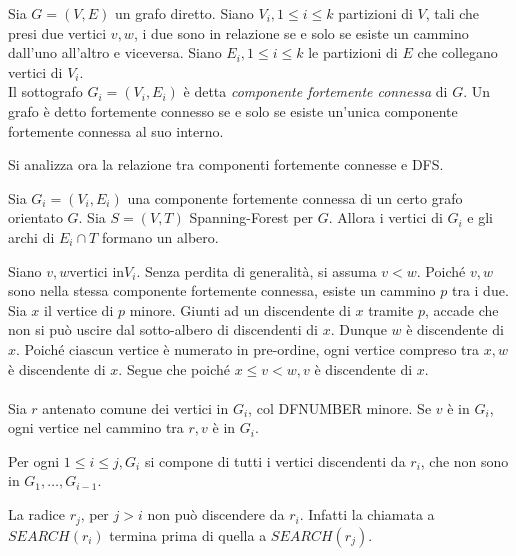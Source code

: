 \documentclass{subfiles}
\begin{document}
\begin{Definition*}
    Sia \(G = (V, E)\) un grafo diretto.
    Siano \(V_{i}, 1 \le i \le k\) partizioni di \(V\), tali che presi due vertici \(v, w\),
    i due sono in relazione se e solo se esiste un cammino dall'uno all'altro e viceversa.
    Siano \(E_{i}, 1 \le i \le k\) le partizioni di \(E\) che collegano vertici di \(V_{i}\).
    \\
    Il sottografo \(G_{i} = (V_{i}, E_{i})\) è detta \emph{componente fortemente connessa} di \(G\).
    Un grafo è detto fortemente connesso se e solo se esiste un'unica componente fortemente connessa al suo interno.
\end{Definition*}

\noindent Si analizza ora la relazione tra componenti fortemente connesse e DFS.

\begin{Lemma}
    Sia \(G_{i} = (V_{i}, E_{i})\) una componente fortemente connessa di un certo grafo orientato \(G\).
    Sia \(S = (V, T)\) Spanning-Forest per \(G\). Allora i vertici di \(G_{i}\) e gli archi di \(E_{i} \cap T\) formano un albero.

    \begin{Proof*}
        Siano \(v, w \text{vertici in} V_{i}\). Senza perdita di generalità, si assuma \(v < w\).
        Poiché \(v, w\) sono nella stessa componente fortemente connessa, esiste un cammino \(p\) tra i due.
        Sia \(x\) il vertice di \(p\) minore. Giunti ad un discendente di \(x\) tramite \(p\), accade che non si può uscire dal sotto-albero di discendenti di \(x\).
        Dunque \(w\) è discendente di \(x\). Poiché ciascun vertice è numerato in pre-ordine, ogni vertice compreso tra \(x, w\) è discendente di \(x\).
        Segue che poiché \(x \le v < w, v\) è discendente di \(x\).
        \\ \\
        Sia \(r\) antenato comune dei vertici in \(G_{i}\), col DFNUMBER minore.
        Se \(v\) è in \(G_{i}\), ogni vertice nel cammino tra \(r, v\) è in \(G_{i}\).
    \end{Proof*}
\end{Lemma}

\begin{Lemma}
    Per ogni \(1 \le i \le j, G_{i}\) si compone di tutti i vertici discendenti da \(r_{i}\), che non sono in \(G_{1}, \ldots, G_{i - 1}\).
    \begin{Proof*}
        La radice \(r_{j} \text{, per } j > i\) non può discendere da \(r_{i}\). Infatti la chiamata a \(SEARCH(r_{i})\) termina prima di quella a \(SEARCH(r_{j})\).
    \end{Proof*}
\end{Lemma}
\end{document}
